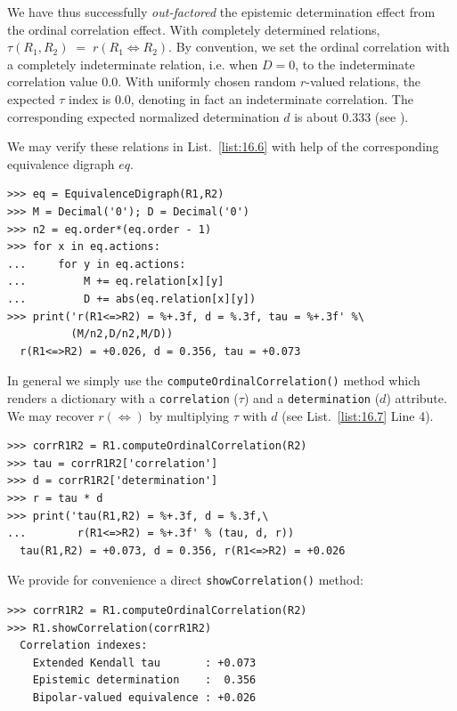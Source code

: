 We have thus successfully \emph{out-factored} the epistemic determination effect from the ordinal correlation effect. With completely determined relations, $\tau(R_1,R_2) \;=\; r(R_1 \Leftrightarrow R_2)$. By convention, we set the ordinal correlation with a completely indeterminate relation, i.e. when $D = 0$, to the indeterminate correlation value $0.0$. With uniformly chosen random $r$-valued relations, the expected $\tau$ index is $0.0$, denoting in fact an indeterminate correlation. The corresponding expected normalized determination $d$ is about $0.333$ (see \citep{BIS-2012a}).

We may verify these relations in List.~\vref{list:16.6} with help of the corresponding equivalence digraph $eq$.
\begin{lstlisting}[caption={Computing the ordinal correlation index from the equivalence digraph},label=list:16.6]
>>> eq = EquivalenceDigraph(R1,R2)
>>> M = Decimal('0'); D = Decimal('0')
>>> n2 = eq.order*(eq.order - 1)
>>> for x in eq.actions:
...     for y in eq.actions:
...         M += eq.relation[x][y]
...         D += abs(eq.relation[x][y])
>>> print('r(R1<=>R2) = %+.3f, d = %.3f, tau = %+.3f' %\
          (M/n2,D/n2,M/D))   
  r(R1<=>R2) = +0.026, d = 0.356, tau = +0.073  
\end{lstlisting}

In general we simply use the \texttt{computeOrdinalCorrelation()} method which renders a dictionary with a \texttt{correlation} ($\tau$) and a \texttt{determination} ($d$) attribute. We may recover $r(\Leftrightarrow)$ by multiplying $\tau$ with $d$ (see List.~\vref{list:16.7} Line 4). 
\begin{lstlisting}[caption={Computing the valued ordinal correlation index},label=list:16.7]
>>> corrR1R2 = R1.computeOrdinalCorrelation(R2)
>>> tau = corrR1R2['correlation']
>>> d = corrR1R2['determination']
>>> r = tau * d
>>> print('tau(R1,R2) = %+.3f, d = %.3f,\
...        r(R1<=>R2) = %+.3f' % (tau, d, r))
  tau(R1,R2) = +0.073, d = 0.356, r(R1<=>R2) = +0.026
\end{lstlisting}

We provide for convenience a direct \texttt{showCorrelation()} method:
\begin{lstlisting}
>>> corrR1R2 = R1.computeOrdinalCorrelation(R2)
>>> R1.showCorrelation(corrR1R2)
  Correlation indexes:
    Extended Kendall tau       : +0.073
    Epistemic determination    :  0.356
    Bipolar-valued equivalence : +0.026
\end{lstlisting}

